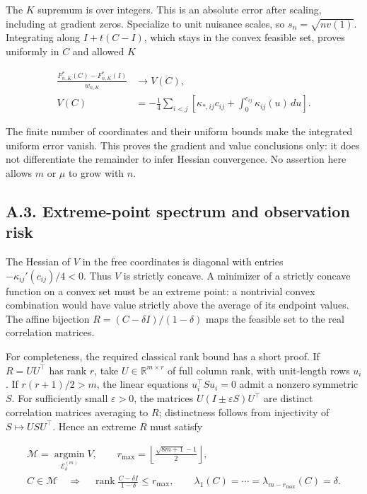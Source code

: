 \documentclass{article}
\begin{document}
The \(K\) supremum is over integers. This is an absolute error after
scaling, including at gradient zeros. Specialize to unit nuisance
scales, so \(s_n=\sqrt{nv(1)}\). Integrating along \(I+t(C-I)\), which
stays in the convex feasible set, proves uniformly in \(C\) and allowed
\(K\)

\[
\begin{aligned}
\frac{F_{n,K}^*(C)-F_{n,K}^*(I)}{w_{n,K}}&\longrightarrow V(C),\\
V(C)&=-\frac14\sum_{i<j}
\left[\kappa_{*,ij}c_{ij}+\int_0^{c_{ij}}\kappa_{ij}(u)\,du\right].
\end{aligned}
\tag{A.16}
\]

The finite number of coordinates and their uniform bounds make the
integrated uniform error vanish. This proves the gradient and value
conclusions only: it does not differentiate the remainder to infer
Hessian convergence. No assertion here allows \(m\) or \(\mu\) to grow
with \(n\).

\subsection*{A.3. Extreme-point spectrum and observation
risk}\label{a.3.-extreme-point-spectrum-and-observation-risk}

The Hessian of \(V\) in the free coordinates is diagonal with entries
\(-\kappa_{ij}'(c_{ij})/4<0\). Thus \(V\) is strictly concave. A
minimizer of a strictly concave function on a convex set must be an
extreme point: a nontrivial convex combination would have value strictly
above the average of its endpoint values. The affine bijection
\(R=(C-\delta I)/(1-\delta)\) maps the feasible set to the real
correlation matrices.

For completeness, the required classical rank bound has a short proof.
If \(R=UU^\top\) has rank \(r\), take \(U\in\mathbb R^{m\times r}\) of
full column rank, with unit-length rows \(u_i\). If \(r(r+1)/2>m\), the
linear equations \(u_i^\top S u_i=0\) admit a nonzero symmetric \(S\).
For sufficiently small \(\varepsilon>0\), the matrices
\(U(I\pm\varepsilon S)U^\top\) are distinct correlation matrices
averaging to \(R\); distinctness follows from injectivity of
\(S\mapsto USU^\top\). Hence an extreme \(R\) must satisfy

\[
\begin{gathered}
\mathcal M=\operatorname*{argmin}_{\mathcal E_\delta^{(m)}}V,\qquad
r_{\max}=\left\lfloor\frac{\sqrt{8m+1}-1}{2}\right\rfloor,\\
C\in\mathcal M\quad\Longrightarrow\quad
\operatorname{rank}\frac{C-\delta I}{1-\delta}\le r_{\max},\qquad
\lambda_1(C)=\cdots=\lambda_{m-r_{\max}}(C)=\delta .
\end{gathered}
\tag{A.17}
\]
\end{document}
